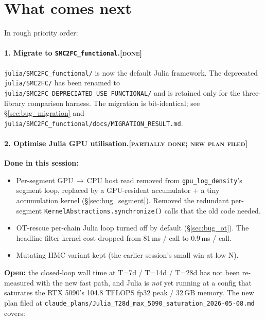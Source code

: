 \documentclass[11pt,a4paper]{article}
\begin{document}
\section{What comes next}\label{sec:next}

In rough priority order:

\paragraph{1. Migrate to \texttt{SMC2FC\_functional}.\hspace{0.2em}\textsc{[done]}}
\texttt{julia/SMC2FC\_functional/} is now the default Julia
framework. The deprecated \texttt{julia/SMC2FC/} has been renamed
to \texttt{julia/SMC2FC\_DEPRECIATED\_USE\_FUNCTIONAL/} and is
retained only for the three-library comparison harness. The
migration is bit-identical; see \S\ref{sec:bug_migration} and
\texttt{julia/SMC2FC\_functional/docs/MIGRATION\_RESULT.md}.

\paragraph{2. Optimise Julia GPU utilisation.\hspace{0.2em}\textsc{[partially done; new plan filed]}}

\textbf{Done in this session:}
\begin{itemize}[itemsep=2pt]
  \item Per-segment GPU\,$\to$\,CPU host read removed from
        \texttt{gpu\_log\_density}'s segment loop, replaced by a
        GPU-resident accumulator + a tiny accumulation kernel
        (\S\ref{sec:bug_segment}). Removed the redundant
        per-segment \texttt{KernelAbstractions.synchronize()}
        calls that the old code needed.
  \item OT-rescue per-chain Julia loop turned off by default
        (\S\ref{sec:bug_ot}). The headline filter kernel cost
        dropped from 81\,ms / call to 0.9\,ms / call.
  \item Mutating HMC variant kept (the earlier session's small
        win at low N).
\end{itemize}

\textbf{Open:} the closed-loop wall time at T=7d / T=14d / T=28d
has not been re-measured with the new fast path, and Julia is
\emph{not} yet running at a config that saturates the RTX 5090's
104.8 TFLOPS fp32 peak / 32\,GB memory. The new plan filed at
\texttt{claude\_plans/Julia\_T28d\_max\_5090\_saturation\_2026-05-08.md}
covers:
\end{document}
